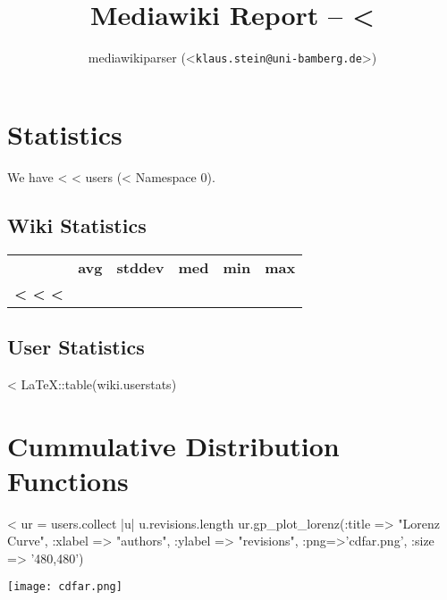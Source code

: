 \documentclass{scrartcl}
\title{Mediawiki Report -- <%
}
\author{mediawikiparser (<\texttt{klaus.stein@uni-bamberg.de}>)}
\begin{document}
\maketitle


\section{Statistics} %
\label{sec:statistics}

We have <%
<%
users (<%
Namespace 0).

\subsection{Wiki Statistics} %
\label{sub:wiki_statistics}

\begin{tabular}{>{\bfseries}lrrrrr}
  &\textbf{avg} &\textbf{stddev} &\textbf{med} &\textbf{min} &\textbf{max}\\
  <%
  <%
  <%
\end{tabular}


\subsection{User Statistics} %
\label{sub:user_statistics}

<%
LaTeX::table(wiki.userstats)





\section{Cummulative Distribution Functions} %
\label{sec:cummulative_distribution_functions}

<%
ur = users.collect { |u| u.revisions.length }
ur.gp_plot_lorenz(:title => "Lorenz Curve", :xlabel => "authors", :ylabel => "revisions", :png=>'cdfar.png', :size => '480,480')
\begin{center}
  \texttt{[image: cdfar.png]}
\end{center}
\end{document}
